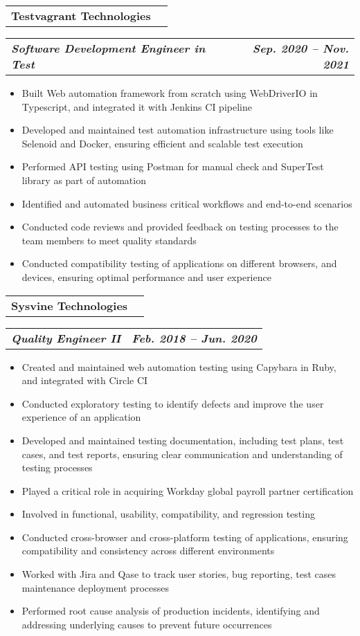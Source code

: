 \documentclass[letterpaper,11pt]{article}
\makeatletter
\newcommand{\resumeItem}[1]{
  \item\small{
    {#1 \vspace{-1pt}}
  }
}
\newcommand{\resumeSubheading}[4]{
  \vspace{-1pt}\item
    \begin{tabular*}{\textwidth}[t]{l@{\extracolsep{\fill}}r}
      \textbf{#1} & {\color{dark-grey}\small #2}\vspace{1pt}\\ %
    \end{tabular*}\vspace{-4pt}
}
\newcommand{\resumeSubSubheading}[2]{
    \item
    \begin{tabular*}{\textwidth}{l@{\extracolsep{\fill}}r}
      \textbf{\textit{\small #1}} & \textbf{\textit{\small #2}} \\
    \end{tabular*}\vspace{-7pt}
}
\newcommand{\resumeItemListStart}{\begin{itemize}}
\newcommand{\resumeItemListEnd}{\end{itemize}\vspace{0pt}}
\makeatother
\begin{document}
    \resumeSubheading
      {Testvagrant Technologies}{}
      {}{}
      \resumeSubSubheading
      {Software Development Engineer in Test}{Sep. 2020 -- Nov. 2021}
      \resumeItemListStart
        \resumeItem{Built Web automation framework from scratch using WebDriverIO in Typescript, and integrated it with Jenkins CI pipeline}
        \resumeItem{Developed and maintained test automation infrastructure using tools like Selenoid and Docker, ensuring efficient and scalable test execution}
        \resumeItem{Performed API testing using Postman for manual check and SuperTest library as part of automation}
        \resumeItem{Identified and automated business critical workflows and end-to-end scenarios}
        \resumeItem{Conducted code reviews and provided feedback on testing processes to the team members to meet quality standards}
        \resumeItem{Conducted compatibility testing of applications on different browsers, and devices, ensuring optimal performance and user experience}
    \resumeItemListEnd

    \resumeSubheading
      {Sysvine Technologies}{}
      {}{}
      \resumeSubSubheading
      {Quality Engineer II}{Feb. 2018 -- Jun. 2020}
      \resumeItemListStart
        \resumeItem{Created and maintained web automation testing using Capybara in Ruby, and integrated with Circle CI}
        \resumeItem{Conducted exploratory testing to identify defects and improve the user experience of an application}
        \resumeItem{Developed and maintained testing documentation, including test plans, test cases, and test reports, ensuring clear communication and understanding of testing processes}
        \resumeItem{Played a critical role in acquiring Workday global payroll partner certification}
        \resumeItem{Involved in functional, usability, compatibility, and regression testing}
        \resumeItem{Conducted cross-browser and cross-platform testing of applications, ensuring compatibility and consistency across different environments}
        \resumeItem{Worked with Jira and Qase to track user stories, bug reporting, test cases maintenance deployment processes}
        \resumeItem{Performed root cause analysis of production incidents, identifying and addressing underlying causes to prevent future occurrences}
      \resumeItemListEnd
\end{document}
